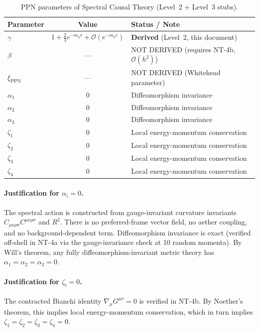 \documentclass[11pt,a4paper]{article}
\newcommand{\Weylsq}{C_{\mu\nu\rho\sigma}C^{\mu\nu\rho\sigma}}
\newcommand{\Rsq}{R^2}
\newcommand{\order}{\mathcal{O}}
\begin{document}
\begin{table}[h]
\centering
\caption{PPN parameters of Spectral Causal Theory (Level~2 + Level~3 stubs).}
\label{tab:ppn}
\begin{tabular}{l c l}
\toprule
Parameter & Value & Status / Note \\
\midrule
$\gamma$ & $1 + \tfrac{2}{3}e^{-m_2 r} + \order(e^{-m_0 r})$
  & \textbf{Derived} (Level~2, this document) \\
$\beta$ & --- & NOT DERIVED (requires NT-4b, $\order(h^2)$) \\
$\xi_{\mathrm{PPN}}$ & --- & NOT DERIVED (Whitehead parameter) \\
$\alpha_1$ & 0 & Diffeomorphism invariance \\
$\alpha_2$ & 0 & Diffeomorphism invariance \\
$\alpha_3$ & 0 & Diffeomorphism invariance \\
$\zeta_1$ & 0 & Local energy-momentum conservation \\
$\zeta_2$ & 0 & Local energy-momentum conservation \\
$\zeta_3$ & 0 & Local energy-momentum conservation \\
$\zeta_4$ & 0 & Local energy-momentum conservation \\
\bottomrule
\end{tabular}
\end{table}

\paragraph{Justification for $\alpha_i = 0$.}
The spectral action is constructed from gauge-invariant curvature
invariants $\Weylsq$ and $\Rsq$.  There is no preferred-frame vector
field, no aether coupling, and no background-dependent term.
Diffeomorphism invariance is exact (verified off-shell in NT-4a via
the gauge-invariance check at 10 random momenta).  By Will's theorem,
any fully diffeomorphism-invariant metric theory has $\alpha_1 = \alpha_2
= \alpha_3 = 0$.

\paragraph{Justification for $\zeta_i = 0$.}
The contracted Bianchi identity $\nabla_\mu G^{\mu\nu} = 0$ is
verified in NT-4b.  By Noether's theorem, this implies local
energy-momentum conservation, which in turn implies
$\zeta_1 = \zeta_2 = \zeta_3 = \zeta_4 = 0$.
\end{document}
